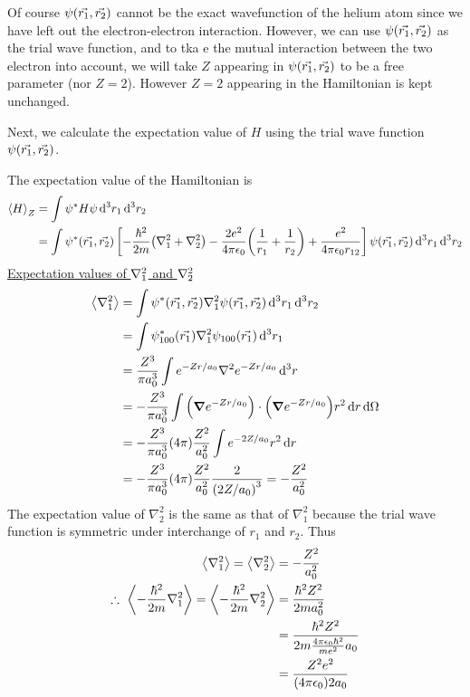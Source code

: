 	Of course $\psi\qty(\vec{r_1}, \vec{r_2}) $ cannot be the exact wavefunction of the helium atom since we have left  out the electron-electron interaction. However, we can use $\psi\qty(\vec{r_1}, \vec{r_2}) $ as the trial wave function, and to tka e the mutual interaction between the two electron into account, we will take $Z$ appearing in $\psi\qty(\vec{r_1}, \vec{r_2}) $ to be a free parameter (nor $Z=2$). However $Z=2$ appearing in the Hamiltonian is kept unchanged.
	
	Next, we calculate the expectation value of $H$ using the trial wave function $\psi\qty(\vec{r_1}, \vec{r_2}) $.
	
	The expectation value of the Hamiltonian is 
	\begin{align*}
		\expval{H}_Z 
		&= \int \psi^* H \psi \dd[3]{r_1}  \dd[3]{r_2} \\
		&= \int \psi^*\qty(\vec{r_1}, \vec{r_2}) \left[
		- \frac{\hbar^2}{2 m} \qty(\nabla_1^2 + \nabla_2^2) - \frac{2 e^2}{4 \pi \epsilon_0} \qty(\frac{1}{r_1} + \frac{1}{r_2})  +  \frac{e^2}{4 \pi \epsilon_0 r_{1 2}}
		\right] \psi\qty(\vec{r_1}, \vec{r_2}) \dd[3]{r_1} \dd[3]{r_2}
	\end{align*}
	\underline{Expectation values of $\laplacian{}_1$ and $\laplacian{}_2$}
	\begin{align*}
		\expval{\nabla_1^2} 
		&= \int \psi^*\qty(\vec{r_1}, \vec{r_2}) \nabla_1^2 \psi\qty(\vec{r_1}, \vec{r_2}) \dd[3]{r_1} \dd[3]{r_2} \\
		&= \int \psi^*_{1 0 0}\qty(\vec{r_1}) \nabla_1^2 \psi_{1 0 0}\qty(\vec{r_1})  \dd[3]{r_1}\\
		&= \frac{Z^3}{\pi a_0^3} \int e^{-Z r/a_0} \nabla^2 e^{-Z r/a_0} \dd[3]{r} \\
		&= -\frac{Z^3}{\pi a_0^3} \int \qty(\grad{e^{-Z r/a_0}}) \cdot \qty(\grad{e^{-Z r/a_0}}) r^2 \dd{r}\dd{\Omega} \\
		&= -\frac{Z^3}{\pi a_0^3} \qty(4\pi) \frac{Z^2}{a_0^2} \int e^{-2 Z /a_0}  r^2 \dd{r}\\
		&= -\frac{Z^3}{\pi a_0^3} \qty(4\pi) \frac{Z^2}{a_0^2} \frac{2}{\qty(2 Z / a_0)^3} = - \frac{Z^2}{a_0^2}
	\end{align*}
	The expectation value of $\nabla_2^2$ is the same as that of $\nabla_1^2$ because the trial wave function is symmetric under interchange of $r_1$ and $r_2$. Thus
	\begin{align}
		\expval{\nabla_1^2} = 		\expval{\nabla_2^2} &= - \frac{Z^2}{a_0^2} \nonumber\\
		\therefore \ \expval{-\frac{\hbar^2}{2 m}\nabla_1^2} = \expval{-\frac{\hbar^2}{2 m}\nabla_2^2} &= \frac{\hbar^2 Z^2}{2 m a_0^2} \nonumber\\
		&= \frac{\hbar^2 Z^2}{2 m \frac{4 \pi \epsilon_0 \hbar^2}{m e^2} a_0} \nonumber\\
		&= \frac{Z^2 e^2}{ \qty(4\pi \epsilon_0) 2 a_0}
		\label{chapter21.eqn2-example-helium}
	\end{align}
	
